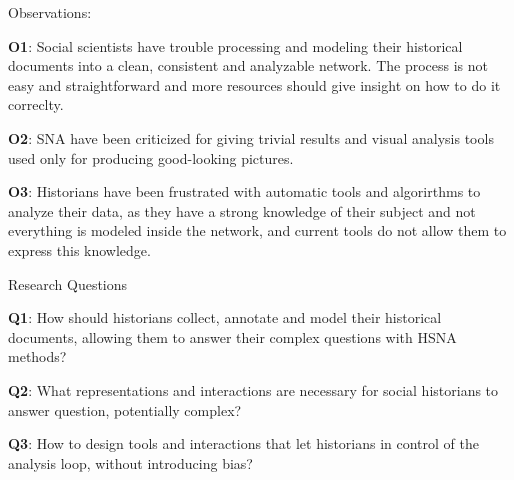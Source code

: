 Observations:
\begin{description}
    \item \textbf{O1}: Social scientists have trouble processing and modeling their historical documents into a clean, consistent and analyzable network. The process is not easy and straightforward and more resources should give insight on how to do it correclty.
    \item \textbf{O2}: SNA have been criticized for giving trivial results and visual analysis tools used only for producing good-looking pictures.
    \item \textbf{O3}: Historians have been frustrated with automatic tools and algorirthms to analyze their data, as they have a strong knowledge of their subject and not everything is modeled inside the network, and current tools do not allow them to express this knowledge.
\end{description}

Research Questions
\begin{description}
    \item \textbf{Q1}: How should historians collect, annotate and model their historical documents, allowing them to answer their complex questions with HSNA methods?
    \item \textbf{Q2}: What representations and interactions are necessary for social historians to answer question, potentially complex?
    \item \textbf{Q3}: How to design tools and interactions that let historians in control of the analysis loop, without introducing bias?
\end{description}